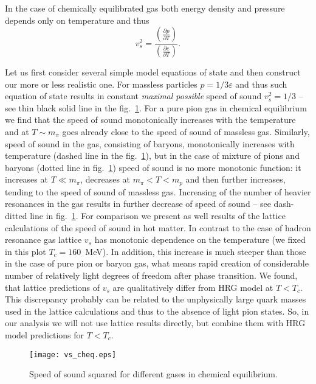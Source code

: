 \documentclass[aps,twocolumn,groupedaddress,superscriptaddress,floatfix]{revtex4}
\begin{document}
In the case of chemically equilibrated gas both energy density and
pressure depends only on temperature and thus
\begin{equation}\label{vs-eqil}
v_s^2=  \frac{\left (\frac{\partial p}{\partial T}\right )}{\left
(\frac{\partial e}{\partial T}\right )}.
\end{equation}

Let us first consider several simple model equations of state and
then construct our more or less realistic one. For massless
particles $p=1/3\varepsilon$ and thus such equation of state
results in constant {\it maximal possible} speed of sound
$v_s^2=1/3$ -- see thin black solid line in the
fig.~\ref{fig:EOS}. For a pure pion gas in chemical equilibrium we
find that the speed of sound monotonically increases with the
temperature and at $T\sim m_\pi$ goes already close to the speed
of sound of massless gas. Similarly, speed of sound in the gas,
consisting of baryons, monotonically increases with temperature
(dashed line in the fig.~\ref{fig:EOS}), but in the case of
mixture of pions and baryons (dotted line in fig.~\ref{fig:EOS})
speed of sound is no more monotonic function: it increases at
$T\ll m_\pi$, decreases at $m_\pi<T<m_p$ and then further
increases, tending to the speed of sound of massless gas.
Increasing of the number of heavier resonances in the gas results
in further decrease of speed of sound -- see dash-ditted line in
fig.~\ref{fig:EOS}. For comparison we present as well results of
the lattice calculations of the speed of sound \cite{latt} in hot
matter. In contrast to the case of hadron resonance gas lattice
$v_s$ has monotonic dependence on the temperature (we fixed in
this plot $T_c=160$~MeV). In addition, this increase is much
steeper than those in the case of pure pion or baryon gas, what
means rapid creation of considerable number of relatively light
degrees of freedom after phase transition. We found, that lattice
predictions of $v_s$ are qualitatively differ from HRG model at
$T<T_c$. This discrepancy probably can be related  to the
unphysically large quark masses used in the lattice calculations
and thus to the absence of light pion states. So, in our analysis
we will not use lattice results directly, but combine them with
HRG model predictions for $T<T_c$.

\begin{figure}[t!]
\texttt{[image: vs\_cheq.eps]}
\caption{Speed of sound squared for different gases in chemical
equilibrium.}\label{fig:EOS}
\end{figure}
\end{document}
